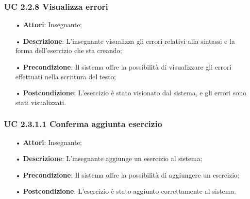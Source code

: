 \subsubsection{UC 2.2.8 Visualizza errori}
\begin{itemize}
	\item[•] \textbf{Attori}: Insegnante;
	\item[•] \textbf{Descrizione}: L'insegnante visualizza gli errori relativi alla sintassi e la forma dell’esercizio che sta creando;
	\item[•] \textbf{Precondizione}: Il sistema offre la possibilità di visualizzare gli errori effettuati nella scrittura del testo;
	\item[•] \textbf{Postcondizione}: L’esercizio è stato visionato dal sistema, e gli errori sono stati visualizzati.
\end{itemize}
\subsubsection{UC 2.3.1.1 Conferma aggiunta esercizio}
\begin{itemize}
	\item[•] \textbf{Attori}: Insegnante;
	\item[•] \textbf{Descrizione}: L'insegnante aggiunge un esercizio al sistema;
	\item[•] \textbf{Precondizione}: Il sistema offre la possibilità di aggiungere un esercizio;
	\item[•] \textbf{Postcondizione}: L’esercizio è stato aggiunto correttamente al sistema.
\end{itemize}






